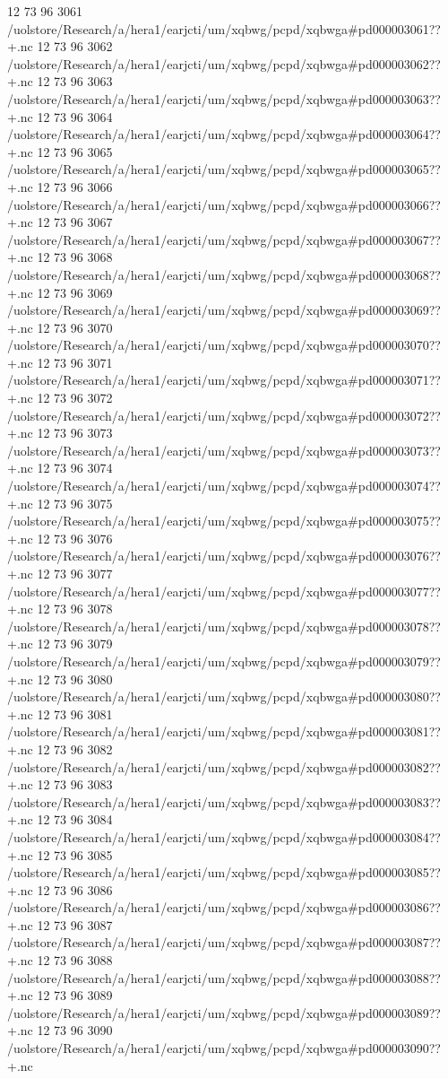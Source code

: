 12 73 96
3061
/uolstore/Research/a/hera1/earjcti/um/xqbwg/pcpd/xqbwga#pd000003061??+.nc
12 73 96
3062
/uolstore/Research/a/hera1/earjcti/um/xqbwg/pcpd/xqbwga#pd000003062??+.nc
12 73 96
3063
/uolstore/Research/a/hera1/earjcti/um/xqbwg/pcpd/xqbwga#pd000003063??+.nc
12 73 96
3064
/uolstore/Research/a/hera1/earjcti/um/xqbwg/pcpd/xqbwga#pd000003064??+.nc
12 73 96
3065
/uolstore/Research/a/hera1/earjcti/um/xqbwg/pcpd/xqbwga#pd000003065??+.nc
12 73 96
3066
/uolstore/Research/a/hera1/earjcti/um/xqbwg/pcpd/xqbwga#pd000003066??+.nc
12 73 96
3067
/uolstore/Research/a/hera1/earjcti/um/xqbwg/pcpd/xqbwga#pd000003067??+.nc
12 73 96
3068
/uolstore/Research/a/hera1/earjcti/um/xqbwg/pcpd/xqbwga#pd000003068??+.nc
12 73 96
3069
/uolstore/Research/a/hera1/earjcti/um/xqbwg/pcpd/xqbwga#pd000003069??+.nc
12 73 96
3070
/uolstore/Research/a/hera1/earjcti/um/xqbwg/pcpd/xqbwga#pd000003070??+.nc
12 73 96
3071
/uolstore/Research/a/hera1/earjcti/um/xqbwg/pcpd/xqbwga#pd000003071??+.nc
12 73 96
3072
/uolstore/Research/a/hera1/earjcti/um/xqbwg/pcpd/xqbwga#pd000003072??+.nc
12 73 96
3073
/uolstore/Research/a/hera1/earjcti/um/xqbwg/pcpd/xqbwga#pd000003073??+.nc
12 73 96
3074
/uolstore/Research/a/hera1/earjcti/um/xqbwg/pcpd/xqbwga#pd000003074??+.nc
12 73 96
3075
/uolstore/Research/a/hera1/earjcti/um/xqbwg/pcpd/xqbwga#pd000003075??+.nc
12 73 96
3076
/uolstore/Research/a/hera1/earjcti/um/xqbwg/pcpd/xqbwga#pd000003076??+.nc
12 73 96
3077
/uolstore/Research/a/hera1/earjcti/um/xqbwg/pcpd/xqbwga#pd000003077??+.nc
12 73 96
3078
/uolstore/Research/a/hera1/earjcti/um/xqbwg/pcpd/xqbwga#pd000003078??+.nc
12 73 96
3079
/uolstore/Research/a/hera1/earjcti/um/xqbwg/pcpd/xqbwga#pd000003079??+.nc
12 73 96
3080
/uolstore/Research/a/hera1/earjcti/um/xqbwg/pcpd/xqbwga#pd000003080??+.nc
12 73 96
3081
/uolstore/Research/a/hera1/earjcti/um/xqbwg/pcpd/xqbwga#pd000003081??+.nc
12 73 96
3082
/uolstore/Research/a/hera1/earjcti/um/xqbwg/pcpd/xqbwga#pd000003082??+.nc
12 73 96
3083
/uolstore/Research/a/hera1/earjcti/um/xqbwg/pcpd/xqbwga#pd000003083??+.nc
12 73 96
3084
/uolstore/Research/a/hera1/earjcti/um/xqbwg/pcpd/xqbwga#pd000003084??+.nc
12 73 96
3085
/uolstore/Research/a/hera1/earjcti/um/xqbwg/pcpd/xqbwga#pd000003085??+.nc
12 73 96
3086
/uolstore/Research/a/hera1/earjcti/um/xqbwg/pcpd/xqbwga#pd000003086??+.nc
12 73 96
3087
/uolstore/Research/a/hera1/earjcti/um/xqbwg/pcpd/xqbwga#pd000003087??+.nc
12 73 96
3088
/uolstore/Research/a/hera1/earjcti/um/xqbwg/pcpd/xqbwga#pd000003088??+.nc
12 73 96
3089
/uolstore/Research/a/hera1/earjcti/um/xqbwg/pcpd/xqbwga#pd000003089??+.nc
12 73 96
3090
/uolstore/Research/a/hera1/earjcti/um/xqbwg/pcpd/xqbwga#pd000003090??+.nc
